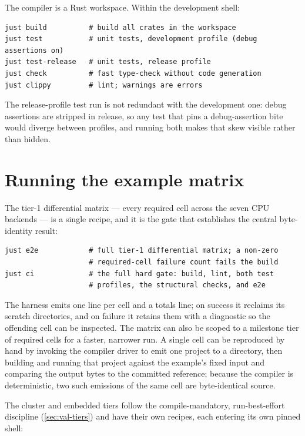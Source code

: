 The compiler is a Rust workspace. Within the development shell:

\begin{verbatim}
just build          # build all crates in the workspace
just test           # unit tests, development profile (debug assertions on)
just test-release   # unit tests, release profile
just check          # fast type-check without code generation
just clippy         # lint; warnings are errors
\end{verbatim}

The release-profile test run is not redundant with the development one: debug
assertions are stripped in release, so any test that pins a debug-assertion bite
would diverge between profiles, and running both makes that skew visible rather than
hidden.

\section{Running the example matrix}\label{sec:matrix-repro}

The tier-1 differential matrix --- every required cell across the seven CPU backends
--- is a single recipe, and it is the gate that establishes the central
byte-identity result:

\begin{verbatim}
just e2e            # full tier-1 differential matrix; a non-zero
                    # required-cell failure count fails the build
just ci             # the full hard gate: build, lint, both test
                    # profiles, the structural checks, and e2e
\end{verbatim}

The harness emits one line per cell and a totals line; on success it reclaims its
scratch directories, and on failure it retains them with a diagnostic so the
offending cell can be inspected. The matrix can also be scoped to a milestone tier
of required cells for a faster, narrower run. A single cell can be reproduced by
hand by invoking the compiler driver to emit one project to a directory, then
building and running that project against the example's fixed input and comparing
the output bytes to the committed reference; because the compiler is deterministic,
two such emissions of the same cell are byte-identical source.

The cluster and embedded tiers follow the compile-mandatory, run-best-effort
discipline (\cref{sec:val-tiers}) and have their own recipes, each entering its own
pinned shell:

